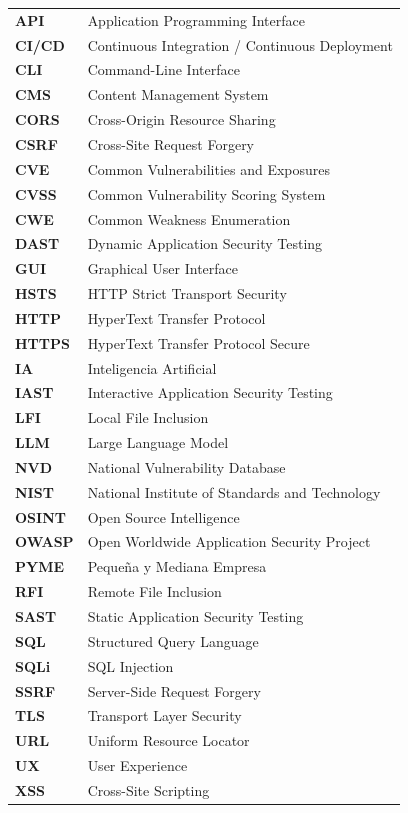 \documentclass[12pt, a4paper]{article}
\begin{document}
\begin{tabular}{p{3cm} p{10cm}}
    \textbf{API}   & Application Programming Interface \\
    \textbf{CI/CD} & Continuous Integration / Continuous Deployment \\
    \textbf{CLI}   & Command-Line Interface \\
    \textbf{CMS}   & Content Management System \\
    \textbf{CORS}  & Cross-Origin Resource Sharing \\
    \textbf{CSRF}  & Cross-Site Request Forgery \\
    \textbf{CVE}   & Common Vulnerabilities and Exposures \\
    \textbf{CVSS}  & Common Vulnerability Scoring System \\
    \textbf{CWE}   & Common Weakness Enumeration \\
    \textbf{DAST}  & Dynamic Application Security Testing \\
    \textbf{GUI}   & Graphical User Interface \\
    \textbf{HSTS}  & HTTP Strict Transport Security \\
    \textbf{HTTP}  & HyperText Transfer Protocol \\
    \textbf{HTTPS} & HyperText Transfer Protocol Secure \\
    \textbf{IA}    & Inteligencia Artificial \\
    \textbf{IAST}  & Interactive Application Security Testing \\
    \textbf{LFI}   & Local File Inclusion \\
    \textbf{LLM}   & Large Language Model \\
    \textbf{NVD}   & National Vulnerability Database \\
    \textbf{NIST}  & National Institute of Standards and Technology \\
    \textbf{OSINT} & Open Source Intelligence \\
    \textbf{OWASP} & Open Worldwide Application Security Project \\
    \textbf{PYME}  & Pequeña y Mediana Empresa \\
    \textbf{RFI}   & Remote File Inclusion \\
    \textbf{SAST}  & Static Application Security Testing \\
    \textbf{SQL}   & Structured Query Language \\
    \textbf{SQLi}  & SQL Injection \\
    \textbf{SSRF}  & Server-Side Request Forgery \\
    \textbf{TLS}   & Transport Layer Security \\
    \textbf{URL}   & Uniform Resource Locator \\
    \textbf{UX}    & User Experience \\
    \textbf{XSS}   & Cross-Site Scripting \\
\end{tabular}
\end{document}
